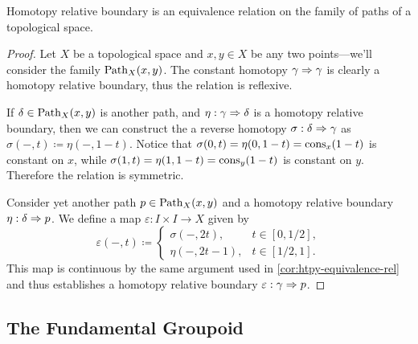 \begin{proposition}
\label{prop:htpy-rel-boundary-is-equiv-relation}
Homotopy relative boundary is an equivalence relation on the family of paths of
a topological space.
\end{proposition}

\begin{proof}
Let \(X\) be a topological space and \(x, y \in X\) be any two points---we'll
consider the family
\(\operatorname{Path}_X(x, y)\). The constant homotopy \(\gamma \Rightarrow \gamma\) is clearly a homotopy relative boundary, thus the relation is reflexive.

If \(\delta \in \operatorname{Path}_X(x, y)\) is another path, and \(\eta: \gamma \Rightarrow
\delta\) is a homotopy relative boundary, then we can construct the a reverse
homotopy \(\sigma: \delta \Rightarrow \gamma\) as \(\sigma(-, t) \coloneq \eta(-, 1 -
t)\). Notice that \(\sigma(0, t) = \eta(0, 1 - t) = \operatorname{cons}_x(1 - t)\) is
constant on \(x\), while \(\sigma(1, t) = \eta(1, 1 - t) = \operatorname{cons}_y(1 - t)\) is
constant on \(y\). Therefore the relation is symmetric.

Consider yet another path \(p \in
\operatorname{Path}_X(x, y)\) and a homotopy relative boundary \(\eta: \delta \Rightarrow p\). We
define a map \(\varepsilon: I \times I \to X\) given by
\[
\varepsilon(-, t) \coloneq
\begin{cases}
  \sigma(-, 2t), &t \in [0, 1/2], \\
  \eta(-, 2 t - 1), &t \in [1/2, 1].
\end{cases}
\]
This map is continuous by the same argument used in
\cref{cor:htpy-equivalence-rel} and thus establishes a homotopy relative boundary
\(\varepsilon: \gamma \Rightarrow p\).
\end{proof}

\subsection{The Fundamental Groupoid}

